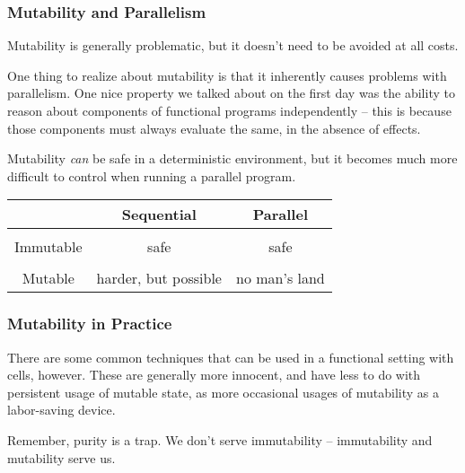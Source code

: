 \documentclass[aspectratio=169, handout]{beamer}
\begin{document}
\begin{frame}[fragile]
  \frametitle{Mutability and Parallelism}

  Mutability is generally problematic, but it doesn't need to be avoided at all
  costs.

  \pause
  \vspace{\fill}

  One thing to realize about mutability is that it inherently causes problems
  with parallelism. One nice property we talked about on the first day was
  the ability to reason about components of functional programs independently --
  this is because those components must always evaluate the same, in the absence
  of effects.

  \pause
  \vspace{\fill}

  Mutability \textit{can} be safe in a deterministic environment, but it becomes
  much more difficult to control when running a parallel program.

  \vspace{\fill}

  \begin{center}
    \begin{tabular}{ c|c|c }
     & Sequential & Parallel \\
    \hline & \\[-1.5ex]
    Immutable & {\color{green!70!black}safe} & {\color{green!70!black}safe} \\ [0.5ex]
    \hline & \\[-1.5ex]
    Mutable & {\color{orange} harder, but possible} & {\color{red} no man's land}
    \end{tabular}
  \end{center}
\end{frame}

\begin{frame}[fragile]
  \frametitle{Mutability in Practice}

  There are some common techniques that can be used in a functional setting
  with  cells, however. These are generally more innocent, and have
  less to do with persistent usage of mutable state, as more occasional
  usages of mutability as a labor-saving device.

  \pause
  \vspace{\fill}

  Remember, purity is a trap. We don't serve immutability -- immutability and
  mutability serve us.
\end{frame}
\end{document}
